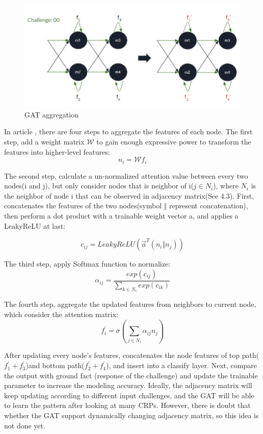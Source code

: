 \begin{figure}[htp]
    \centering
    \includegraphics[width=16cm]{figures/figure12.jpg}
    \caption{GAT aggregation}
    \label{fig:figure12}
    \end{figure}

In article \cite{Reference10}, there are four steps to aggregate the features of each node. The first step, add a weight matrix $\mathcal{W}$ to gain enough expressive power to transform the features into higher-level features:
\begin{equation}
    n_i = \mathcal{W}f_i
\end{equation}

The second step, calculate a un-normalized attention value between every two nodes(i and j), but only consider nodes that is neighbor of i($j \in N_i$), where $N_i$ is the neighbor of node i that can be observed in 
adjacency matrix(See 4.3). First, concatenates the features of the two nodes(symbol $\Vert$ represent concatenation), then perform a dot product with a trainable weight vector a, and applies a LeakyReLU at last:

\begin{equation}
    c_{ij} = LeakyReLU(\overrightarrow{a}^T(n_i \Vert n_j))
\end{equation}

The third step, apply Softmax function to normalize:
\begin{equation}
    \alpha_{ij} = \frac{exp(c_{ij})}{\sum_{k \in N_i}  exp(c_{ik})} 
\end{equation}

The fourth step, aggregate the updated features from neighbors to current node, which consider the attention matrix:
\begin{equation}
    f_i^{'} = \sigma (\sum_{j \in N_i} \alpha_{ij}n_j)
\end{equation}

After updating every node's features, concatenates the node features of top path($f_1^{'}+f_3^{'}$)and bottom path($f_2^{'}+f_4^{'}$), and insert into a classify layer. Next, compare the output with ground fact
(response of the challenge) and update the trainable parameter to increase the modeling accuracy. Ideally, the adjacency matrix will keep updating according to different input challenges, and the GAT will be able to 
learn the pattern after looking at many CRPs. However, there is doubt that whether the GAT support dynamically changing adjacency matrix, so this idea is not done yet.





